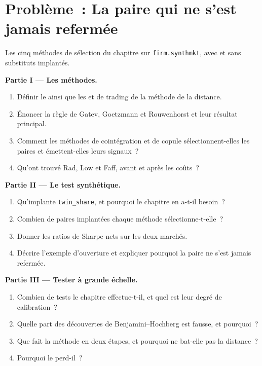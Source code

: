 \section{Problème~: La paire qui ne s'est jamais refermée}

\begin{problem}\label{pb:s1:pairs-and-baskets:1}
Les cinq méthodes de sélection du chapitre sur \texttt{firm.synthmkt}, avec et sans substituts implantés.

\medskip\noindent\textbf{Partie I --- Les méthodes.}
\begin{enumerate}
\item Définir le  ainsi que les  et de trading de la méthode de la distance.
\item Énoncer la règle de Gatev, Goetzmann et Rouwenhorst et leur résultat principal.
\item Comment les méthodes de cointégration et de copule sélectionnent-elles les paires et émettent-elles leurs signaux~?
\item Qu'ont trouvé Rad, Low et Faff, avant et après les coûts~?
\end{enumerate}

\medskip\noindent\textbf{Partie II --- Le test synthétique.}
\begin{enumerate}[resume]
\item Qu'implante \texttt{twin\_share}, et pourquoi le chapitre en a-t-il besoin~?
\item Combien de paires implantées chaque méthode sélectionne-t-elle~?
\item Donner les ratios de Sharpe nets sur les deux marchés.
\item Décrire l'exemple d'ouverture et expliquer pourquoi la paire ne s'est jamais refermée.
\end{enumerate}

\medskip\noindent\textbf{Partie III --- Tester à grande échelle.}
\begin{enumerate}[resume]
\item Combien de tests le chapitre effectue-t-il, et quel est leur degré de calibration~?
\item Quelle part des découvertes de Benjamini--Hochberg est fausse, et pourquoi~?
\item Que fait la méthode en deux étapes, et pourquoi ne bat-elle pas la distance~?
\item Pourquoi le  perd-il~?
\end{enumerate}


\end{problem}
